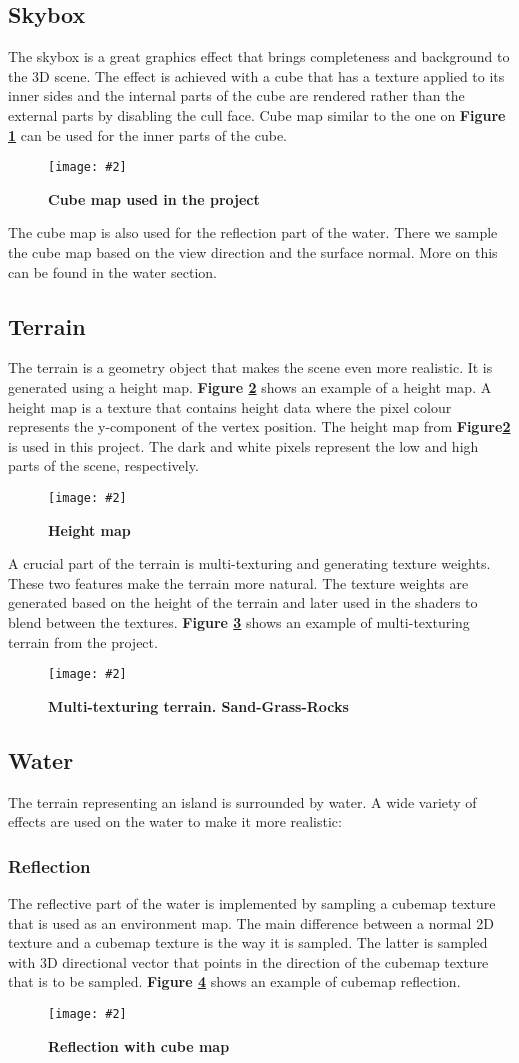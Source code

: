 \documentclass[10pt, a4paper]{article}
\newcommand{\figuremacro}[5]{
    \begin{figure}[#1]
        \centering
        \texttt{[image: \#2]}
        \caption[#3]{\textbf{#3}#4}
        \label{fig:#2}
    \end{figure}
}
\begin{document}
	\subsection{Skybox}
	The skybox is a great graphics effect that brings completeness and background to the 3D scene. The effect is achieved with a cube that has a texture applied to its inner sides and the internal parts of the cube are rendered rather than the external parts by disabling the cull face. Cube map similar to the one on \textbf{Figure {\ref{fig:skybox}}} can be used for the inner parts of the cube.
	\figuremacro{h}{skybox}{Cube map used in the project}{ }{0.9}	
	
	The cube map is also used for the reflection part of the water. There we sample the cube map based on the view direction and the surface normal. More on this can be found in the water section. 
	\subsection{Terrain}
	The terrain is a geometry object that makes the scene even more realistic. It is generated using a height map. \textbf{Figure {\ref{fig:heightmap}}} shows an example of a height map. A height map is a texture that contains height data where the pixel colour represents the y-component of the vertex position. The height map from \textbf{Figure{\ref{fig:heightmap}}} is used in this project. The dark and white pixels represent the low and high parts of the scene, respectively. 
	\figuremacro{h}{heightmap}{Height map}{ }{0.8}
	
	A crucial part of the terrain is multi-texturing and generating texture weights. These two features make the terrain more natural. The texture weights are generated based on the height of the terrain and later used in the shaders to blend between the textures. \textbf{Figure {\ref{fig:multiTexturing}}} shows an example of multi-texturing terrain from the project.
	\figuremacro{h}{multiTexturing}{Multi-texturing terrain. Sand-Grass-Rocks}{ }{0.8}
	\subsection{Water}
	The terrain representing an island is surrounded by water. A wide variety of effects are used on the water to make it more realistic:
	\subsubsection{Reflection}
	The reflective part of the water is implemented by sampling a cubemap texture that is used as an environment map. The main difference between a normal 2D texture and a cubemap texture is the way it is sampled. The latter is sampled with 3D directional vector that points in the direction of the cubemap texture that is to be sampled. \textbf{Figure {\ref{fig:cubemapReflection}}} shows an example of cubemap reflection.
	\figuremacro{h}{cubemapReflection}{Reflection with cube map}{ }{1.0}
\end{document}
